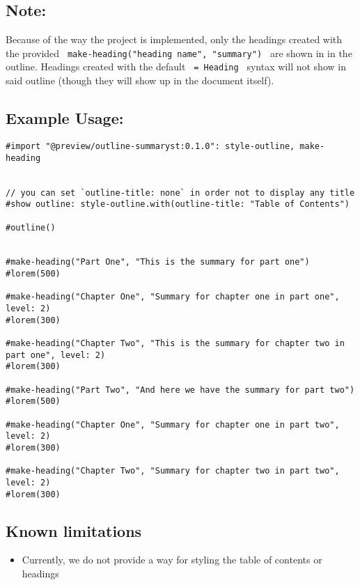 \subsection{Note:}\label{note}

Because of the way the project is implemented, only the headings created
with the provided \texttt{\ make-heading("heading\ name",\ "summary")\ }
are shown in in the outline. Headings created with the default
\texttt{\ =\ Heading\ } syntax will not show in said outline (though
they will show up in the document itself).

\subsection{Example Usage:}\label{example-usage}

\begin{verbatim}
#import "@preview/outline-summaryst:0.1.0": style-outline, make-heading


// you can set `outline-title: none` in order not to display any title
#show outline: style-outline.with(outline-title: "Table of Contents")

#outline()


#make-heading("Part One", "This is the summary for part one")
#lorem(500)

#make-heading("Chapter One", "Summary for chapter one in part one", level: 2)
#lorem(300)

#make-heading("Chapter Two", "This is the summary for chapter two in part one", level: 2)
#lorem(300)

#make-heading("Part Two", "And here we have the summary for part two")
#lorem(500)

#make-heading("Chapter One", "Summary for chapter one in part two", level: 2)
#lorem(300)

#make-heading("Chapter Two", "Summary for chapter two in part two", level: 2)
#lorem(300)
\end{verbatim}

\subsection{Known limitations}\label{known-limitations}

\begin{itemize}
\tightlist
\item
  Currently, we do not provide a way for styling the table of contents
  or headings
\end{itemize}


